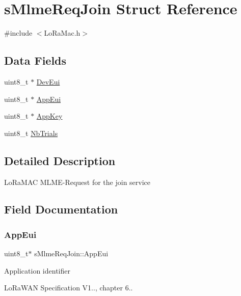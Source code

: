 \hypertarget{structsMlmeReqJoin}{}\section{s\+Mlme\+Req\+Join Struct Reference}
\label{structsMlmeReqJoin}


{\ttfamily \#include $<$Lo\+Ra\+Mac.\+h$>$}

\subsection*{Data Fields}
\begin{DoxyCompactItemize}
\item 
uint8\+\_\+t $\ast$ \hyperlink{structsMlmeReqJoin_abd56390965a0e3a80e198d9ae39d1625}{Dev\+Eui}
\item 
uint8\+\_\+t $\ast$ \hyperlink{structsMlmeReqJoin_a46bda1421b6d9dc9e6444ece02fd77d0}{App\+Eui}
\item 
uint8\+\_\+t $\ast$ \hyperlink{structsMlmeReqJoin_a3bd1a01c6d01990265ec2b5bf0dd906f}{App\+Key}
\item 
uint8\+\_\+t \hyperlink{structsMlmeReqJoin_aa01aa1a2d54c6b90e7d972c28306a6e4}{Nb\+Trials}
\end{DoxyCompactItemize}


\subsection{Detailed Description}
Lo\+Ra\+M\+AC M\+L\+M\+E-\/\+Request for the join service 

\subsection{Field Documentation}
\mbox{\label{structsMlmeReqJoin_a46bda1421b6d9dc9e6444ece02fd77d0}} 
\subsubsection{\texorpdfstring{App\+Eui}{AppEui}}
{\footnotesize\ttfamily uint8\+\_\+t$\ast$ s\+Mlme\+Req\+Join\+::\+App\+Eui}

Application identifier

Lo\+Ra\+W\+AN Specification V1.., chapter 6.. \mbox{\label{structsMlmeReqJoin_a3bd1a01c6d01990265ec2b5bf0dd906f}} 
